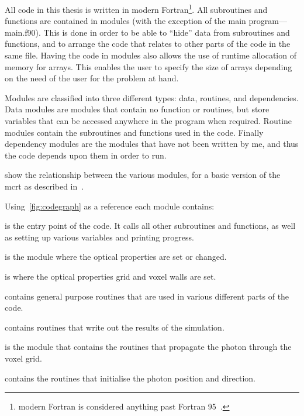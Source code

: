 All code in this thesis is written in modern Fortran\footnote{modern Fortran is considered anything past Fortran 95~\cite{metcalf2011modern}.}.
All subroutines and functions are contained in modules (with the exception of the main program---main.f90).
This is done in order to be able to ``hide'' data from subroutines and functions, and to arrange the code that relates to other parts of the code in the same file.
Having the code in modules also allows the use of runtime allocation of memory for arrays.
This enables the user to specify the size of arrays depending on the need of the user for the problem at hand.

Modules are classified into three different types: data, routines, and dependencies.
Data modules are modules that contain no function or routines, but store variables that can be accessed anywhere in the program when required.
Routine modules contain the subroutines and functions used in the code.
Finally dependency modules are the modules that have not been written by me, and thus the code depends upon them in order to run.

 show the relationship between the various modules, for a basic version of the \gls*{mcrt} as described in~.

\medskip
\indent Using~\cref{fig:codegraph} as a reference each module contains:

 is the entry point of the code. It calls all other subroutines and functions, as well as setting up various variables and printing progress.

 is the module where the optical properties are set or changed.

 is where the optical properties grid and voxel walls are set.

 contains general purpose routines that are used in various different parts of the code.

 contains routines that write out the results of the simulation.

 is the module that contains the routines that propagate the photon through the voxel grid.

 contains the routines that initialise the photon position and direction.

